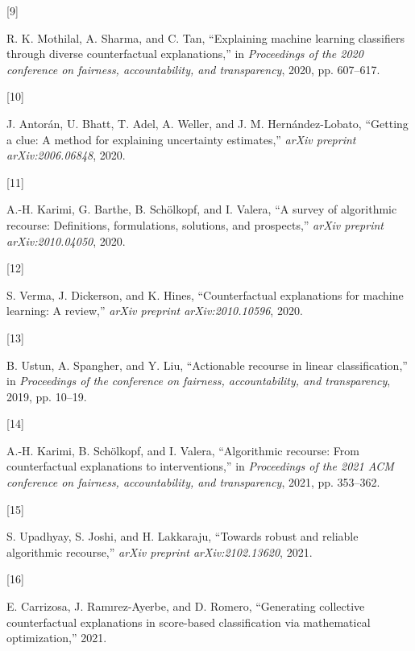 \documentclass[
  conference]{IEEEtran}
\newlength{\cslhangindent}
\newlength{\csllabelwidth}
\newlength{\cslentryspacingunit} %
\newenvironment{CSLReferences}[2] %
 {%
  \setlength{\parindent}{0pt}
  \ifodd #1
  \let\oldpar\par
  \def\par{\hangindent=\cslhangindent\oldpar}
  \fi
  \setlength{\parskip}{#2\cslentryspacingunit}
 }%
 {}
\newcommand{\CSLLeftMargin}[1]{\parbox[t]{\csllabelwidth}{#1}}
\newcommand{\CSLRightInline}[1]{\parbox[t]{\linewidth - \csllabelwidth}{#1}\break}
\begin{document}
\begin{CSLReferences}{0}{0}
\leavevmode{}%
\CSLLeftMargin{{[}9{]} }%
\CSLRightInline{R. K. Mothilal, A. Sharma, and C. Tan, {``Explaining
machine learning classifiers through diverse counterfactual
explanations,''} in \emph{Proceedings of the 2020 conference on
fairness, accountability, and transparency}, 2020, pp. 607--617.}

\leavevmode{}%
\CSLLeftMargin{{[}10{]} }%
\CSLRightInline{J. Antorán, U. Bhatt, T. Adel, A. Weller, and J. M.
Hernández-Lobato, {``Getting a clue: A method for explaining uncertainty
estimates,''} \emph{arXiv preprint arXiv:2006.06848}, 2020.}

\leavevmode{}%
\CSLLeftMargin{{[}11{]} }%
\CSLRightInline{A.-H. Karimi, G. Barthe, B. Schölkopf, and I. Valera,
{``A survey of algorithmic recourse: Definitions, formulations,
solutions, and prospects,''} \emph{arXiv preprint arXiv:2010.04050},
2020.}

\leavevmode{}%
\CSLLeftMargin{{[}12{]} }%
\CSLRightInline{S. Verma, J. Dickerson, and K. Hines, {``Counterfactual
explanations for machine learning: A review,''} \emph{arXiv preprint
arXiv:2010.10596}, 2020.}

\leavevmode{}%
\CSLLeftMargin{{[}13{]} }%
\CSLRightInline{B. Ustun, A. Spangher, and Y. Liu, {``Actionable
recourse in linear classification,''} in \emph{Proceedings of the
conference on fairness, accountability, and transparency}, 2019, pp.
10--19.}

\leavevmode{}%
\CSLLeftMargin{{[}14{]} }%
\CSLRightInline{A.-H. Karimi, B. Schölkopf, and I. Valera,
{``Algorithmic recourse: From counterfactual explanations to
interventions,''} in \emph{Proceedings of the 2021 ACM conference on
fairness, accountability, and transparency}, 2021, pp. 353--362.}

\leavevmode{}%
\CSLLeftMargin{{[}15{]} }%
\CSLRightInline{S. Upadhyay, S. Joshi, and H. Lakkaraju, {``Towards
robust and reliable algorithmic recourse,''} \emph{arXiv preprint
arXiv:2102.13620}, 2021.}

\leavevmode{}%
\CSLLeftMargin{{[}16{]} }%
\CSLRightInline{E. Carrizosa, J. Ramırez-Ayerbe, and D. Romero,
{``Generating collective counterfactual explanations in score-based
classification via mathematical optimization,''} 2021.}


\end{CSLReferences}
\end{document}
